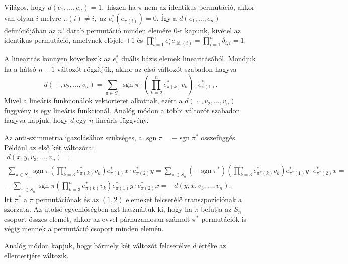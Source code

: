 \documentclass[9pt, a4paper, showtrims]{memoir}
\makeatletter
\renewenvironment{proof}[1][\proofname]
    {\par\pushQED{\qed}%
    \normalfont \topsep6\p@\@plus6\p@\relax
    \trivlist
    \item[\hskip\labelsep
        \itshape
    #1\@addpunct{:}]\ignorespaces}
    {\popQED\endtrivlist\@endpefalse}
\theoremstyle{plain}
\theoremstyle{remark}
\theoremstyle{definition}
\DeclareMathOperator{\sgn}{sgn}
\DeclareMathOperator{\id}{id}
\makeatother
\begin{document}
\begin{proof}
    Világos, 
    hogy $d\left( e_{1},\ldots ,e_{n}\right) =1,$ 
    hiszen ha $\pi $ nem az identikus permutáció, 
    akkor van olyan $i$ melyre $\pi \left( i\right) \neq i,$
    az $e_{i}^{\ast }\left( e_{\pi \left( i\right) }\right) =0$.
    Így a $d\left( e_1,\dots,e_n \right)$ definíciójában az $n!$ darab permutáció minden elemére $0$-t
    kapunk, kivétel az identikus permutáció,
    amelynek előjele $+1$ és 
    $
    \prod_{i=1}^ne_i^\star e_{\id(i)}
    =
    \prod_{i=1}^n\delta_{i,i}=1.
    $

    A linearitás könnyen következik az $e_{i}^\ast$ duális bázis elemek linearitásából. 
    Mondjuk ha a hátsó $n-1$ változót rögzítjük, 
    akkor az első változót szabadon hagyva
    \[
    d\left(\,\cdot\,,v_{2},\ldots ,v_{n}\right)  
    =
    \sum_{\pi\in S_{n}}\sgn\pi
        \cdot
        \left(\prod_{k=2}^ne_{\pi\left( k\right) }^\ast v_k\right)
            \cdot
            e_{\pi\left( 1\right)}^\ast.
    \]
    Mivel a lineáris funkcionálok vektorteret alkotnak, 
    ezért a $d\left( \,\cdot\,,v_2,\dots,v_n \right)$ függvény is egy lineáris funkcionál.
    Analóg módon a többi változót szabadon hagyva kapjuk, hogy $d$ egy $n$-lineáris függvény.

    Az anti-szimmetria igazolásához szükséges, a $\sgn\pi =-\sgn\pi^\ast$ összefüggés. 
    Például az első két változóra:
    \begin{multline*}
    d\left( x,y,v_{3},\ldots ,v_{n}\right)  
    =
    \\
    \sum_{\pi \in S_{n}}\sgn\pi \left( \prod_{k=3}^{n}e_{\pi \left( k\right) }^{\ast }v_{k}\right)
        e_{\pi \left( 1\right) }^\ast x 
        \cdot 
        e_{\pi \left( 2\right)}^\ast y
    =
    \sum_{\pi \in S_{n}}(-\sgn\pi^\ast)
        \left(\prod_{k=3}^{n}e_{\pi ^{\ast }\left( k\right) }^{\ast }v_{k}\right) 
            e_{\pi^\ast\left( 1\right) }^{\ast } y 
            \cdot
            e_{\pi^\ast\left(2\right) }^\ast x
    =
    \\
    -\sum_{\pi \in S_{n}}\operatorname{sgn}\pi \left( \prod_{k=3}^{n}e_{\pi \left( k\right) }^{\ast }v_{k}\right) 
        e_{\pi \left( 1\right) }^{\ast }y 
        \cdot
        e_{\pi \left( 2\right) }^{\ast } x
    =
    -d\left(y,x,v_{3},\ldots ,v_{n}\right) .
    \end{multline*}
    Itt $\pi^\ast$ a $\pi$ permutációnak és az $(1,2)$ elemeket felcserélő transzpozíciónak a szorzata.
    Az utolsó egyenlőségben azt használtuk ki, 
    hogy ha $\pi$ befutja az $S_n$ csoport összes elemét, 
    akkor az evvel párhuzamosan számolt $\pi^\ast$ permutációk is végig mennek a permutáció csoport minden elemén.

    Analóg módon kapjuk, hogy bármely két változót felcserélve $d$ értéke az ellentettjére változik.
\end{proof}
\end{document}

